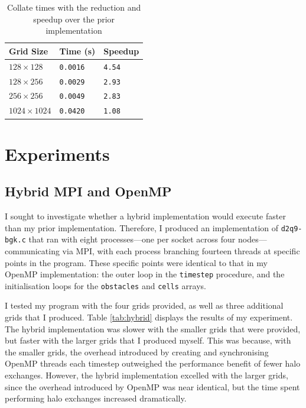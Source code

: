 \documentclass[twocolumn, a4paper]{article}
\begin{document}
\begin{table}[htbp]
  \begin{center}
  \caption{Collate times with the reduction and speedup over the prior implementation}\label{tab:reduction}
  \begin{tabular}[t]{l | l l} 
      \hline\hline
      Grid Size&Time (s)&Speedup\\
      \hline
      $128 \times 128$&\texttt{0.0016}&\texttt{4.54}\\
      $128 \times 256$&\texttt{0.0029}&\texttt{2.93}\\
      $256 \times 256$&\texttt{0.0049}&\texttt{2.83}\\
      $1024 \times 1024$&\texttt{0.0420}&\texttt{1.08}\\
      \hline
    \end{tabular}
  \end{center}
\end{table}

\section{Experiments}

\subsection{Hybrid MPI and OpenMP}

I sought to investigate whether a hybrid implementation would execute faster than my prior implementation.
Therefore, I produced an implementation of \texttt{d2q9-bgk.c} that ran with eight processes---one per socket across four nodes---communicating via MPI, with each process branching fourteen threads at specific points in the program.
These specific points were identical to that in my OpenMP implementation: the outer loop in the \texttt{timestep} procedure, and the initialisation loops for the \texttt{obstacles} and \texttt{cells} arrays.

I tested my program with the four grids provided, as well as three additional grids that I produced.
Table \ref{tab:hybrid} displays the results of my experiment.
The hybrid implementation was slower with the smaller grids that were provided, but faster with the larger grids that I produced myself.
This was because, with the smaller grids, the overhead introduced by creating and synchronising OpenMP threads each timestep outweighed the performance benefit of fewer halo exchanges.
However, the hybrid implementation excelled with the larger grids, since the overhead introduced by OpenMP was near identical, but the time spent performing halo exchanges increased dramatically. 
\end{document}
